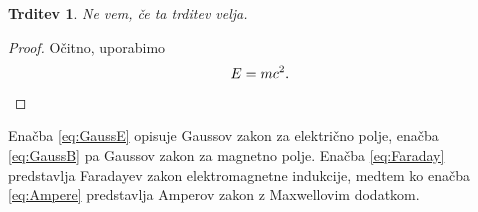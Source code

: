 \documentclass[12pt]{article}
\theoremstyle{plain}
\newtheorem{izrek}{Izrek}
\newtheorem{trd}[izrek]{Trditev}
\theoremstyle{definition}
\newtheorem{defja}[izrek]{Definicija}
\theoremstyle{remark}
\newtheorem*{zgled}{Zgled}
\begin{document}

\vspace{2cm}
\begin{trd} 
  Ne vem, če ta trditev velja.
\end{trd}
\begin{proof}
  Očitno, uporabimo
  \[E=mc^2.\qedhere\]
\end{proof}


\clearpage


Enačba \ref{eq:GaussE} opisuje Gaussov zakon za električno polje, enačba \ref{eq:GaussB} pa Gaussov zakon za magnetno polje. Enačba \ref{eq:Faraday} predstavlja Faradayev zakon elektromagnetne indukcije, medtem ko enačba \ref{eq:Ampere} predstavlja Amperov zakon z Maxwellovim dodatkom.

\clearpage
\end{document}
